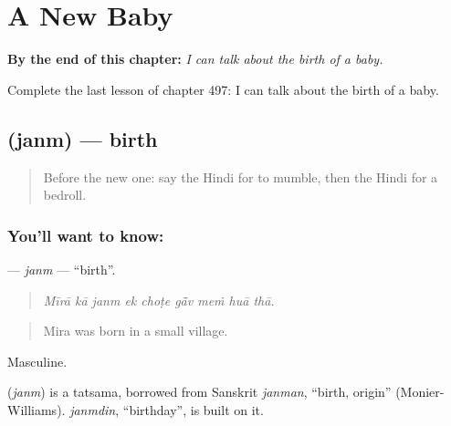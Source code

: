 
\chapter{A New Baby}
\label{ch:hi-a-new-baby}

\begin{chapteropening}
\textbf{By the end of this chapter:} \emph{I can talk about the birth of a baby.}

Complete the last lesson of chapter 497: I can talk about the birth of a baby.
\end{chapteropening}

\section[\texorpdfstring{\hi{जन्म} (janm)}{जन्म (janm)}]{ (janm) — birth}

\label{lesson:HI-C497-janm}



\begin{quote}
Before the new one: say the Hindi for to mumble, then the Hindi for a bedroll.
\end{quote}

\subsection*{You'll want to know: }
\textbf{} — \emph{janm} — \textquotedblleft{}birth\textquotedblright{}.

\begin{quote}
        
\end{quote}

\begin{quote}
\emph{Mīrā kā janm ek choṭe gā̃v meṁ huā thā.}
\end{quote}

\begin{quote}
Mira was born in a small village.
\end{quote}

Masculine.

\begin{cousinweb}
\textbf{} (\emph{janm}) is a tatsama, borrowed from Sanskrit \emph{janman}, \textquotedblleft{}birth, origin\textquotedblright{} (Monier-Williams). \emph{janmdin}, \textquotedblleft{}birthday\textquotedblright{}, is built on it.
\end{cousinweb}

